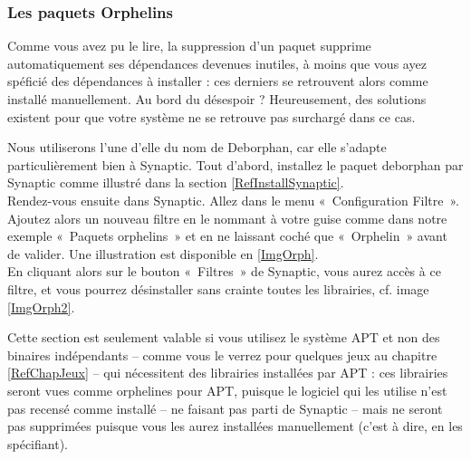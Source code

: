 {\subsubsection{Les paquets Orphelins}
Comme vous avez pu le lire, la suppression d'un paquet supprime automatiquement ses dépendances devenues inutiles, à moins que vous ayez spéficié des dépendances à installer : ces derniers se retrouvent alors comme installé manuellement. Au bord du désespoir ? Heureusement, des solutions existent pour que votre système ne se retrouve pas surchargé dans ce cas.\par
Nous utiliserons l'une d'elle du nom de Deborphan, car elle s'adapte particulièrement bien à Synaptic. Tout d'abord, installez le paquet deborphan par Synaptic comme illustré dans la section \ref{RefInstallSynaptic}.\\
Rendez-vous ensuite dans Synaptic. Allez dans le menu «~Configuration \FlecheDroite Filtre~». Ajoutez alors un nouveau filtre en le nommant à votre guise comme dans notre exemple «~Paquets orphelins~» et en ne laissant coché que «~Orphelin~» avant de valider. Une illustration est disponible en \ref{ImgOrph}.\\
En cliquant alors sur le bouton «~Filtres~» de Synaptic, vous aurez accès à ce filtre, et vous pourrez désinstaller sans crainte toutes les librairies, cf. image \ref{ImgOrph2}.\\
\begin{nota}
Cette section est seulement valable si vous utilisez le système APT et non des binaires indépendants -- comme vous le verrez pour quelques jeux au chapitre \ref{RefChapJeux} -- qui nécessitent des librairies installées par APT : ces librairies seront vues comme orphelines pour APT, puisque le logiciel qui les utilise n'est pas recensé comme installé -- ne faisant pas parti de Synaptic -- mais ne seront pas supprimées puisque vous les aurez installées manuellement (c'est à dire, en les spécifiant).
\end{nota}
}
